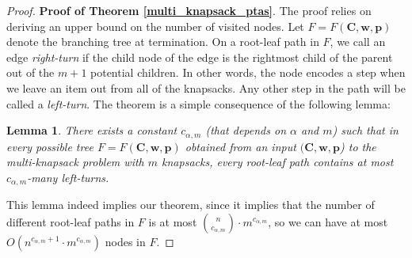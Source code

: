 \documentclass[moor,sglanonrev]{informs4}
\theoremstyle{plain}
\newtheorem{lmm}{Lemma}  %
\begin{document}

\begin{proof}{\textbf{Proof of Theorem \ref{multi_knapsack_ptas}}.}
    The proof relies on deriving an upper bound on the number of visited nodes. Let $F = F(\bm{C}, \bm{w}, \bm{p})$ denote the branching tree at termination. On a root-leaf path in $F$, we call an edge \emph{right-turn} if the child node of the edge is the rightmost child of the parent out of the $m+1$ potential children. In other words, the node encodes a step when we leave an item out from all of the knapsacks. Any other step in the path will be called a \emph{left-turn}. The theorem is a simple consequence of the following lemma:

    \begin{lmm}\label{root-leaf}
        There exists a constant $c_{\alpha,m}$ (that depends on $\alpha$ and $m$) such that in every possible tree $F= F(\mathbf{C}, \mathbf{w}, \mathbf{p})$ obtained from an input $(\mathbf{C}, \mathbf{w}, \mathbf{p}$) to the multi-knapsack problem with $m$ knapsacks, every root-leaf path contains at most $c_{\alpha,m}$-many left-turns.
    \end{lmm}

    This lemma indeed implies our theorem, since it implies that the number of different root-leaf paths in $F$ is at most $\binom{n}{c_{\alpha,m}}\cdot m^{c_{\alpha,m}}$, so we can have at most $O(n^{c_{\alpha,m}+1} \cdot m ^{c_{\alpha,m}})$ nodes in $F$.
\end{proof}
\end{document}
